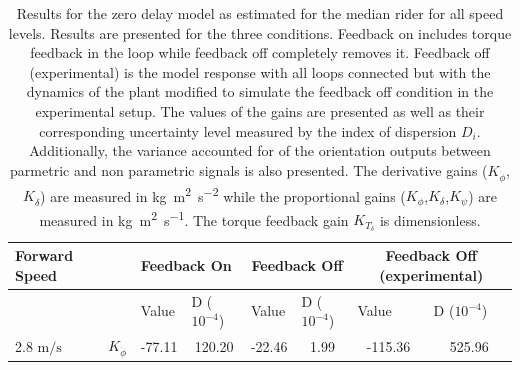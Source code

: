 \begin{table}[]
    \caption{ Results for the zero delay model as estimated for the median rider for all speed levels. Results are presented for the three conditions. Feedback on includes torque feedback in the loop while feedback off completely removes it. Feedback off (experimental) is the model response with all loops connected but with the dynamics of the plant modified to simulate the feedback off condition in the experimental setup. The values of the gains are presented as well as their corresponding uncertainty level measured by the index of dispersion \ensuremath{D_i}. Additionally, the variance accounted for of the orientation outputs between parmetric and non parametric signals is also presented. The derivative gains (\ensuremath{K_{\dot{\phi}}},\ensuremath{K_{\dot{\delta}}}) are measured in \si{\kilogram\square\meter\per\square\second} while the proportional gains (\ensuremath{K_{\phi}},\ensuremath{K_{\delta}},\ensuremath{K_{\psi}}) are measured in \si{\kilogram\square\meter\per\second}. The torque feedback gain \ensuremath{K_{T_\delta}} is dimensionless.}
    \begin{tabular}{llcccccc}
    \hline
    Forward Speed                &                       & \multicolumn{2}{l}{Feedback On}                                                                 & \multicolumn{2}{c}{Feedback Off}                                                                & \multicolumn{2}{c}{Feedback Off (experimental)}                                                 \\ \hline
                                 &                       & \multicolumn{1}{l}{\multirow{2}{*}{Value}} & \multicolumn{1}{l}{\multirow{2}{*}{D ($10^{-4}$)}} & \multicolumn{1}{l}{\multirow{2}{*}{Value}} & \multicolumn{1}{l}{\multirow{2}{*}{D ($10^{-4}$)}} & \multicolumn{1}{l}{\multirow{2}{*}{Value}} & \multicolumn{1}{l}{\multirow{2}{*}{D ($10^{-4}$)}} \\
                                 &                       & \multicolumn{1}{l}{}                       & \multicolumn{1}{l}{}                               & \multicolumn{1}{l}{}                       & \multicolumn{1}{l}{}                               & \multicolumn{1}{l}{}                       & \multicolumn{1}{l}{}                               \\ \cline{3-8} 
    2.8 $\si{\meter\per\second}$ & $K_{\dot{\phi}} $     & -77.11                                     & 120.20                                             & -22.46                                     & 1.99                                               & -115.36                                    & 525.96                                             \\

\end{tabular}
\end{table}
